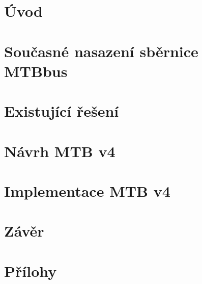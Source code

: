 \documentclass[digital, oneside, table, nolot, nolof]{fithesis3}
\begin{document}

\setlength{\parindent}{0cm}
\setlength{\parskip}{3mm plus2pt minus2pt}
\renewenvironment{compactenum}
	{\begin{enumerate}[leftmargin=8mm,itemsep=0pt,parsep=1pt,topsep=1pt,partopsep=1pt]}
	{\end{enumerate}}
\renewenvironment{compactitem}
	{\begin{itemize}[leftmargin=8mm,itemsep=0pt,parsep=0pt,topsep=1pt,partopsep=1pt]}
	{\end{itemize}}



\chapter{Úvod} \label{chap:uvod}


\chapter{Současné nasazení sběrnice MTBbus} \label{chap:nasazeni}


\chapter{Existující řešení} \label{chap:existujici-reseni}


\chapter{Návrh MTB v4} \label{chap:mtb-v4-design}


\chapter{Implementace MTB v4} \label{chap:mtb-v4-impl}
%
%
%
%
%
%

\chapter{Závěr} \label{chap:zaver}


\printbibliography[heading=bibintoc]

\appendix
\chapter{Přílohy} \label{chap:appendix}

\end{document}
